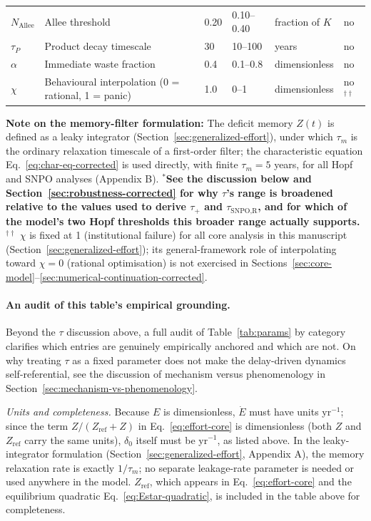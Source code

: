 \documentclass[twocolumn,10pt]{article}
\begin{document}
\begin{table}[t]
\begin{tabularx}{\textwidth}{l X l l l l}
\(N_{\text{Allee}}\) & Allee threshold & 0.20 & 0.10--0.40 & fraction of \(K\) & no \\
\(\tau_P\) & Product decay timescale & 30 & 10--100 & years & no \\
\(\alpha\) & Immediate waste fraction & 0.4 & 0.1--0.8 & dimensionless & no \\
\(\chi\) & Behavioural interpolation (0 = rational, 1 = panic) & 1.0 & 0--1 & dimensionless & no\(^{\dagger\dagger}\) \\
\bottomrule
\end{tabularx}
\par\medskip
\noindent \textbf{Note on the memory-filter formulation:} The deficit memory $Z(t)$ is defined as a leaky integrator (Section~\ref{sec:generalized-effort}), under which $\tau_m$ is the ordinary relaxation timescale of a first-order filter; the characteristic equation Eq.~\eqref{eq:char-eq-corrected} is used directly, with finite $\tau_m=5$ years, for all Hopf and SNPO analyses (Appendix B). \textbf{$^{*}$See the discussion below and Section~\ref{sec:robustness-corrected} for why $\tau$'s range is broadened relative to the values used to derive $\tau_+$ and $\tau_{\text{SNPO,R}}$, and for which of the model's two Hopf thresholds this broader range actually supports.} \textbf{$^{\dagger\dagger}$} $\chi$ is fixed at 1 (institutional failure) for all core analysis in this manuscript (Section~\ref{sec:generalized-effort}); its general-framework role of interpolating toward $\chi=0$ (rational optimisation) is not exercised in Sections~\ref{sec:core-model}--\ref{sec:numerical-continuation-corrected}.
\end{table}

\paragraph{An audit of this table's empirical grounding.}
\label{sec:parameter-audit}
Beyond the $\tau$ discussion above, a full audit of Table~\ref{tab:params} by category clarifies which entries are genuinely empirically anchored and which are not. On why treating $\tau$ as a fixed parameter does not make the delay-driven dynamics self-referential, see the discussion of mechanism versus phenomenology in Section~\ref{sec:mechanism-vs-phenomenology}.

\emph{Units and completeness.} Because $E$ is dimensionless, $\dot E$ must have units yr\(^{-1}\); since the term $Z/(Z_{\text{ref}}+Z)$ in Eq.~\eqref{eq:effort-core} is dimensionless (both $Z$ and $Z_{\text{ref}}$ carry the same units), $\delta_0$ itself must be yr\(^{-1}\), as listed above. In the leaky-integrator formulation (Section~\ref{sec:generalized-effort}, Appendix A), the memory relaxation rate is exactly $1/\tau_m$; no separate leakage-rate parameter is needed or used anywhere in the model. $Z_{\text{ref}}$, which appears in Eq.~\eqref{eq:effort-core} and the equilibrium quadratic Eq.~\eqref{eq:Estar-quadratic}, is included in the table above for completeness.
\end{document}
